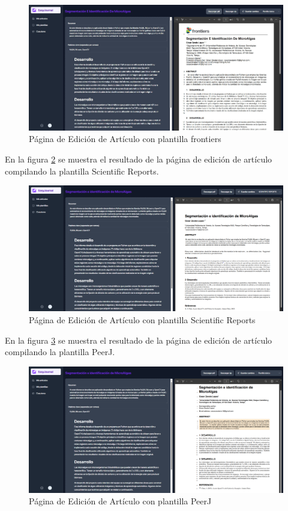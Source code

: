\begin{figure}[H]
    \centering
    \includegraphics[width=1\textwidth]{IMAGENES/captura-10.png}
    \caption{Página de Edición de Artículo con plantilla frontiers}
    \label{fig:captura-10}
\end{figure}

En la figura \ref{fig:captura-11} se muestra el resultado de la página de edición de artículo compilando la plantilla Scientific Reports.

\begin{figure}[H]
    \centering
    \includegraphics[width=1\textwidth]{IMAGENES/captura-11.png}
    \caption{Página de Edición de Artículo con plantilla Scientific Reports}
    \label{fig:captura-11}
\end{figure}

En la figura \ref{fig:captura-12} se muestra el resultado de la página de edición de artículo compilando la plantilla PeerJ.

\begin{figure}[H]
    \centering
    \includegraphics[width=1\textwidth]{IMAGENES/captura-12.png}
    \caption{Página de Edición de Artículo con plantilla PeerJ}
    \label{fig:captura-12}

\end{figure}

